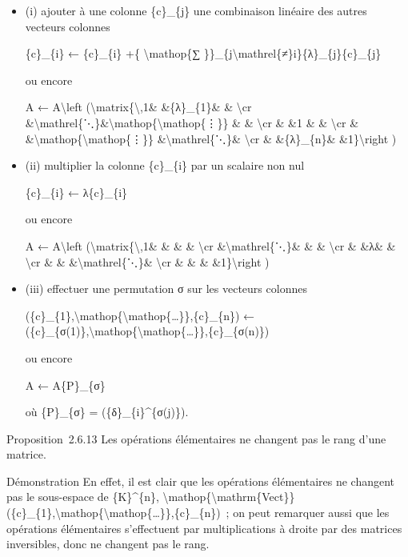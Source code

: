 \documentclass[]{article}
\begin{document}
\begin{itemize}
\item
  (i) ajouter à une colonne \{c\}\_\{j\} une combinaison linéaire des
  autres vecteurs colonnes

  \{c\}\_\{i\} ← \{c\}\_\{i\} +\{ \textbackslash{}mathop\{∑
  \}\}\_\{j\textbackslash{}mathrel\{≠\}i\}\{λ\}\_\{j\}\{c\}\_\{j\}

  ou encore

  A ← A\textbackslash{}left
  (\textbackslash{}matrix\{\textbackslash{},1\& \&\{λ\}\_\{1\}\& \&
  \textbackslash{}cr
  \&\textbackslash{}mathrel\{⋱\}\&\textbackslash{}mathop\{\textbackslash{}mathop\{⋮\}\}
  \& \& \textbackslash{}cr \& \&1 \& \& \textbackslash{}cr \&
  \&\textbackslash{}mathop\{\textbackslash{}mathop\{⋮\}\}
  \&\textbackslash{}mathrel\{⋱\}\& \textbackslash{}cr \&
  \&\{λ\}\_\{n\}\& \&1\}\textbackslash{}right )
\item
  (ii) multiplier la colonne \{c\}\_\{i\} par un scalaire non nul

  \{c\}\_\{i\} ← λ\{c\}\_\{i\}

  ou encore

  A ← A\textbackslash{}left
  (\textbackslash{}matrix\{\textbackslash{},1\& \& \& \&
  \textbackslash{}cr \&\textbackslash{}mathrel\{⋱\}\& \& \&
  \textbackslash{}cr \& \&λ\& \& \textbackslash{}cr \& \&
  \&\textbackslash{}mathrel\{⋱\}\& \textbackslash{}cr \& \& \&
  \&1\}\textbackslash{}right )
\item
  (iii) effectuer une permutation σ sur les vecteurs colonnes

  (\{c\}\_\{1\},\textbackslash{}mathop\{\textbackslash{}mathop\{\ldots{}\}\},\{c\}\_\{n\})
  ←
  (\{c\}\_\{σ(1)\},\textbackslash{}mathop\{\textbackslash{}mathop\{\ldots{}\}\},\{c\}\_\{σ(n)\})

  ou encore

  A ← A\{P\}\_\{σ\}

  où \{P\}\_\{σ\} = (\{δ\}\_\{i\}\^{}\{σ(j)\}).
\end{itemize}

Proposition~2.6.13 Les opérations élémentaires ne changent pas le rang
d'une matrice.

Démonstration En effet, il est clair que les opérations élémentaires ne
changent pas le sous-espace de \{K\}\^{}\{n\},
\textbackslash{}mathop\{\textbackslash{}mathrm\{Vect\}\}(\{c\}\_\{1\},\textbackslash{}mathop\{\textbackslash{}mathop\{\ldots{}\}\},\{c\}\_\{n\})~;
on peut remarquer aussi que les opérations élémentaires s'effectuent par
multiplications à droite par des matrices inversibles, donc ne changent
pas le rang.
\end{document}
